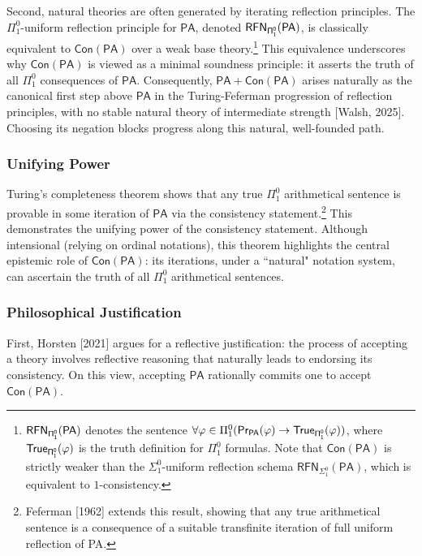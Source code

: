 \documentclass[a4paper,12pt]{amsart}
\theoremstyle{definition}
\numberwithin{equation}{section}
\begin{document}
Second, natural theories are often generated by iterating reflection principles. The $\Pi^0_1$-uniform reflection principle for $\mathsf{PA}$, denoted $\sf RFN_{\Pi^0_1}(\mathsf{PA})$, is classically equivalent to $\mathsf{Con}(\mathsf{PA})$ over a weak base theory.\footnote{$\sf RFN_{\Pi^0_1}(\mathsf{PA})$ denotes the sentence $\forall \varphi\in \Pi^0_1 (\sf Pr_{\mathsf{PA}}(\varphi)\rightarrow \sf True_{\Pi^0_1}(\varphi))$, where $\sf True_{\Pi^0_1}(\varphi)$ is the truth definition for $\Pi^0_1$ formulas. Note that $\mathsf{Con}(\mathsf{PA})$ is strictly weaker than the $\Sigma^0_1$-uniform reflection schema $\mathsf{RFN}_{\Sigma^0_1}(\mathsf{PA})$, which is equivalent to $1$-consistency.} This equivalence underscores why $\mathsf{Con}(\mathsf{PA})$ is viewed as a minimal soundness principle: it asserts the truth of all $\Pi^0_1$ consequences of $\mathsf{PA}$. Consequently, $\mathsf{PA} + \mathsf{Con(PA)}$ arises naturally as the canonical first step above $\mathsf{PA}$ in the Turing-Feferman progression of reflection principles, with no stable natural theory of intermediate strength [Walsh, 2025]. Choosing its negation blocks progress along this natural, well-founded path. 



\subsubsection{Unifying Power}

Turing's completeness theorem shows that any true $\Pi^0_1$ arithmetical sentence is provable in some iteration of $\mathsf{PA}$ via the consistency statement.\footnote{Feferman [1962] extends this result, showing that any true arithmetical sentence is a consequence of a suitable transfinite iteration of full uniform reflection of {\sf PA}.}   This demonstrates the unifying power of the consistency statement. Although intensional (relying on ordinal notations), this theorem highlights the central epistemic role of $\mathsf{Con(PA)}$: its iterations, under a ``natural" notation system, can ascertain the truth of all $\Pi^0_1$ arithmetical sentences.


\subsubsection{Philosophical Justification}


                    
First, Horsten [2021] argues for a reflective justification: the process of accepting a theory involves reflective reasoning that naturally leads to endorsing its consistency. On this view, accepting $\mathsf{PA}$ rationally commits one to accept $\mathsf{Con(PA)}$.
\end{document}
